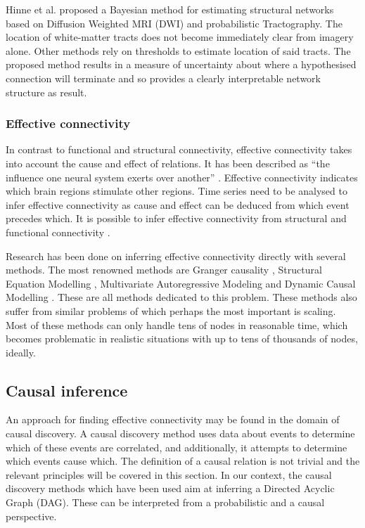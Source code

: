 \documentclass[a4paper, 10pt, english, onecolumn]{article}
\begin{document}
Hinne et al. \cite{hinne2013} proposed a Bayesian method for estimating structural networks based on Diffusion Weighted MRI (DWI) and probabilistic Tractography.
The location of white-matter tracts does not become immediately clear from imagery alone.
Other methods rely on thresholds to estimate location of said tracts.
The proposed method results in a measure of uncertainty about where a hypothesised connection will terminate and so provides a clearly interpretable network structure as result.

\subsubsection{Effective connectivity}
In contrast to functional and structural connectivity, effective connectivity takes into account the cause and effect of relations.
It has been described as ``the influence one neural system exerts over another'' \cite{friston1994}.
Effective connectivity indicates which brain regions stimulate other regions.
Time series need to be analysed to infer effective connectivity as cause and effect can be deduced from which event precedes which. 
It is possible to infer effective connectivity from structural and functional connectivity \cite{mclntosh1994, harrison2003, friston2003, roebroeck2005}.

Research has been done on inferring effective connectivity directly with several methods.
The most renowned methods are Granger causality \cite{roebroeck2005}, Structural Equation Modelling \cite{mclntosh1994}, Multivariate Autoregressive Modeling \cite{harrison2003} and Dynamic Causal Modelling \cite{friston2003}.
These are all methods dedicated to this problem.
These methods also suffer from similar problems of which perhaps the most important is scaling.
Most of these methods can only handle tens of nodes in reasonable time, which becomes problematic in realistic situations with up to tens of thousands of nodes, ideally.

\subsection{Causal inference}
An approach for finding effective connectivity may be found in the domain of causal discovery.
A causal discovery method uses data about events to determine which of these events are correlated, and additionally, it attempts to determine which events cause which.
The definition of a causal relation is not trivial \cite[p.20]{spirtes2000} and the relevant principles will be covered in this section.
In our context, the causal discovery methods which have been used aim at inferring a Directed Acyclic Graph (DAG).
These can be interpreted from a probabilistic and a causal perspective.
\end{document}
